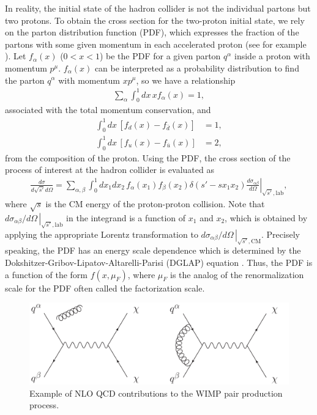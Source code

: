 \documentclass[12pt,twoside,book]{article}
\begin{document}
In reality, the initial state of the hadron collider is not the individual partons but two protons.
To obtain the cross section for the two-proton initial state, we rely on the parton distribution function (PDF), which expresses the fraction of the partons with some given momentum in each accelerated proton (see for example \cite{Gao:2017yyd,Kovarik:2019xvh}).
Let $f_\alpha (x)$ ($0 < x < 1$) be the PDF for a given parton $q^\alpha$ inside a proton with momentum $p^\mu$.
$f_\alpha (x)$ can be interpreted as a probability distribution to find the parton $q^\alpha$ with momentum $x p^\mu$, so we have a relationship
\begin{align}
  \sum_\alpha \int_0^1 dx \, x f_\alpha (x) = 1,
\end{align}
associated with the total momentum conservation, and
\begin{align}
  \int_0^1 dx \, \left[ f_d (x) - f_{\bar{d}} (x) \right] &= 1,\\
  \int_0^1 dx \, \left[ f_u (x) - f_{\bar{u}} (x) \right] &= 2,
\end{align}
from the composition of the proton.
Using the PDF, the cross section of the process of interest at the hadron collider is evaluated as
\begin{align}
  \frac{d \sigma}{d \sqrt{s'} d \Omega} =
  \sum_{\alpha, \beta} \int_0^1 dx_1 dx_2 \, f_\alpha (x_1) f_\beta (x_2) \delta \left( s' - s x_1 x_2 \right)
  \left. \frac{d \sigma_{\alpha \beta}}{d \Omega} \right|_{\sqrt{s'}, \text{lab}},
\end{align}
where $\sqrt{s}$ is the CM energy of the proton-proton collision.
Note that $\left. d \sigma_{\alpha \beta} / d \Omega\, \right|_{\sqrt{s'}, \text{lab}}$ in the integrand is a function of $x_1$ and $x_2$, which is obtained by applying the appropriate Lorentz transformation to $\left. d \sigma_{\alpha \beta} / d \Omega\, \right|_{\sqrt{s'}, \text{CM}}$.
Precisely speaking, the PDF has an energy scale dependence which is determined by the Dokshitzer-Gribov-Lipatov-Altarelli-Parisi (DGLAP) equation \cite{Gribov:1972ri, Lipatov:1974qm, Altarelli:1977zs, Dokshitzer:1977sg}.
Thus, the PDF is a function of the form $f(x, \mu_F)$, where $\mu_F$ is the analog of the renormalization scale for the PDF often called the factorization scale.

\begin{figure}[t]
  \centering
  \includegraphics[width=0.8\hsize]{WIMP_production_NLO.pdf}
  \caption{Example of NLO QCD contributions to the WIMP pair production process.}
  \label{fig:WIMP_production_NLO}
\end{figure}
\end{document}
